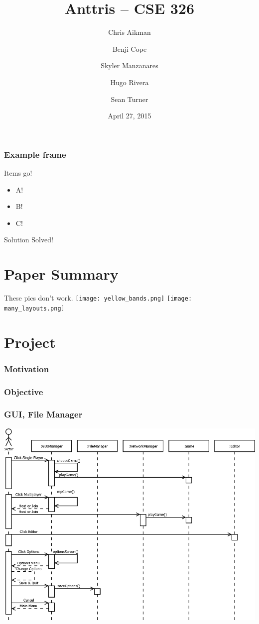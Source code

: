 \documentclass{beamer}
\title{Anttris -- CSE 326}
\author{%
\and Chris Aikman
\and Benji Cope
\and Skyler Manzanares
\and Hugo Rivera
\and Sean Turner}
\date{April 27, 2015}
\begin{document}
\begin{frame}
\titlepage
\end{frame}

\begin{frame}
    \frametitle{Example frame}
    Items go!
\begin{itemize}
\pause \item A!
\pause \item B!
\pause \item C!
\end{itemize}

\begin{alertblock}{Solution}
Solved!
\end{alertblock}

\end{frame}

\section{Paper Summary}
\begin{frame}
    These pics don't work.
\texttt{[image: yellow\_bands.png]}
\pause
\texttt{[image: many\_layouts.png]}
\end{frame}






\section{Project}

\begin{frame}
  \frametitle{Motivation} %
\end{frame}

\begin{frame}
  \frametitle{Objective} %
\end{frame}


\begin{frame}
    \frametitle{GUI, File Manager} %
    \includegraphics[width=1\linewidth]{Anttris_GUISequence.png}
\end{frame}
\end{document}
